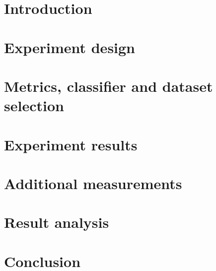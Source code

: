 \documentclass[a4paper,11pt,pdftex,halfparskip,oneside,cleardoubleempty]{scrbook}
\begin{document}

\pagestyle{plain} 



\chapter{Introduction}
\label{sec:introduction}


\chapter{Experiment design}
\label{sec:experiment}


\chapter{Metrics, classifier and dataset selection}
\label{sec:selection}


\chapter{Experiment results}
\label{sec:results}


\chapter{Additional measurements}
\label{sec:additional}


\chapter{Result analysis}
\label{sec:testing}



\chapter{Conclusion}
\label{sec:conclusion}




\end{document}
